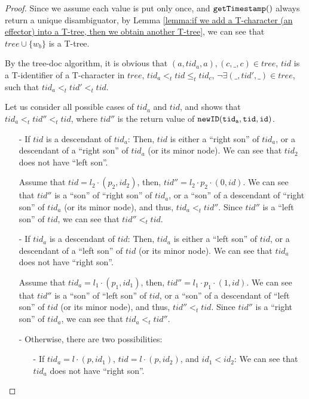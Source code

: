 \begin {proof}
Since we assume each value is put only once, and $\alabelshort[{\tt getTimestamp}]{}$ always return a unique disambiguator, by Lemma \ref{lemma:if we add a T-character (an effector) into a T-tree, then we obtain another T-tree}, we can see that $tree \cup \{ w_b \}$ is a T-tree.

By the tree-doc algorithm, it is obvious that $(a,tid_a,a),(c,\_,c) \in tree$, $tid$ is a T-identifier of a T-character in $tree$, $tid_a <_t tid \leq_t tid_c$, $ \neg \exists (\_,tid',\_) \in tree$, such that $tid_a <_t tid' <_t tid$.

Let us consider all possible cases of $tid_a$ and $tid$, and shows that $tid_a <_t tid'' <_t tid$, where $tid''$ is the return value of $\alabelshort[{\tt newID}]{tid_a,tid,id}$.

\begin{itemize}
\setlength{\itemsep}{0.5pt}
\item[-] If $tid$ is a descendant of $tid_a$: Then, $tid$ is either a ``right son'' of $tid_a$, or a descendant of a ``right son'' of $tid_a$ (or its minor node). We can see that $tid_2$ does not have ``left son''.

    Assume that $tid = l_2 \cdot (p_2,id_2)$, then, $tid'' = l_2 \cdot p_2 \cdot (0,id)$. We can see that $tid''$ is a ``son'' of ``right son'' of $tid_a$, or a ``son'' of a descendant of ``right son'' of $tid_a$ (or its minor node), and thus, $tid_a <_t tid''$. Since $tid''$ is a ``left son'' of $tid$, we can see that $tid'' <_t tid$.

\item[-] If $tid_a$ is a descendant of $tid$: Then, $tid_a$ is either a ``left son'' of $tid$, or a descendant of a ``left son'' of $tid$ (or its minor node). We can see that $tid_a$ does not have ``right son''.

    Assume that $tid_a = l_1 \cdot (p_1,id_1)$, then, $tid'' = l_1 \cdot p_1 \cdot (1,id)$. We can see that $tid''$ is a ``son'' of ``left son'' of $tid$, or a ``son'' of a descendant of ``left son'' of $tid$ (or its minor node), and thus, $tid'' <_t tid$. Since $tid''$ is a ``right son'' of $tid_a$, we can see that $tid_a <_t tid''$.

\item[-] Otherwise, there are two possibilities:
    \begin{itemize}
    \setlength{\itemsep}{0.5pt}
    \item[-] If $tid_a = l \cdot (p,id_1)$, $tid = l \cdot (p,id_2)$, and $id_1 < id_2$: We can see that $tid_a$ does not have ``right son''.


\end{itemize}
\end{itemize}
\end{proof}
